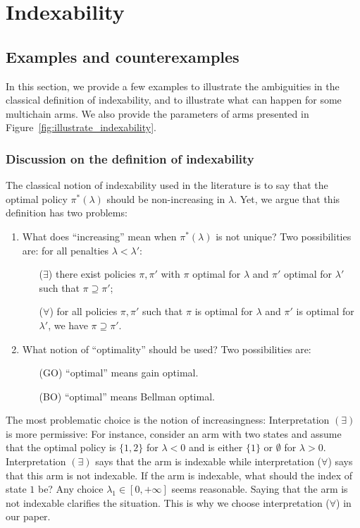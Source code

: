 \begingroup

\let\clearpage\relax
\chapter{Indexability}
\label{chp:apx_indexability}

\section{Examples and counterexamples}

In this section, we provide a few examples to illustrate the ambiguities in the classical definition of indexability, and to illustrate what can happen for some multichain arms. We also provide the parameters of arms presented in Figure~\ref{fig:illustrate_indexability}.

\subsection{Discussion on the definition of indexability}
\label{apx:discussion_index}

The classical notion of indexability used in the literature is to say that the optimal policy $\pi^*(\lambda)$ should be non-increasing in $\lambda$. Yet, we argue that this definition has two problems:
\begin{enumerate}
    \item What does ``increasing'' mean when $\pi^*(\lambda)$ is not unique? Two possibilities are: for all penalties $\lambda<\lambda'$:
    \begin{enumerate}
        \item[($\exists$)] there exist policies $\pi,\pi'$ with $\pi$ optimal for $\lambda$ and $\pi'$ optimal for $\lambda'$ such that $\pi\supseteq\pi'$;
        \item[($\forall$)] for all policies $\pi,\pi'$ such that  $\pi$ is optimal for $\lambda$ and $\pi'$ is optimal for $\lambda'$, we have $\pi\supseteq\pi'$.
    \end{enumerate}
    \item What notion of ``optimality'' should be used? Two possibilities are: 
    \begin{enumerate}
       \item[(GO)] ``optimal'' means gain optimal.
       \item[(BO)] ``optimal'' means Bellman optimal.
   \end{enumerate}
\end{enumerate}
The most problematic choice is the notion of increasingness: Interpretation $(\exists)$ is more permissive: For instance, consider an arm with two states and assume that the optimal policy is $\{1,2\}$ for $\lambda<0$ and is either $\{1\}$ or $\emptyset$ for $\lambda>0$. Interpretation $(\exists)$ says that the arm is indexable while interpretation ($\forall$) says that this arm is not indexable. If the arm is indexable, what should the index of state $1$ be? Any choice $\lambda_1\in[0,+\infty]$ seems reasonable. Saying that the arm is not indexable clarifies the situation. This is why we choose interpretation ($\forall$) in our paper.


